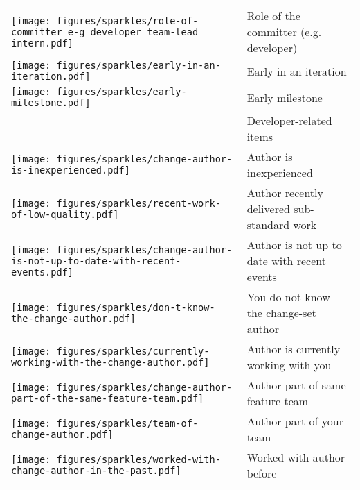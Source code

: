 \begin{table}[t!]
\begin{tabular}{ll}
\vspace{-2pt}\texttt{[image: figures/sparkles/role-of-committer--e-g--developer--team-lead--intern.pdf]} & Role of the committer (e.g. developer)\\
\vspace{-2pt}\texttt{[image: figures/sparkles/early-in-an-iteration.pdf]} & Early in an iteration\\
\vspace{-2pt}\texttt{[image: figures/sparkles/early-milestone.pdf]} & Early milestone\\
\midrule
\vspace{-2pt}& Developer-related items\\
\midrule
\vspace{-2pt}\texttt{[image: figures/sparkles/change-author-is-inexperienced.pdf]} & Author is inexperienced\\
\vspace{-2pt}\texttt{[image: figures/sparkles/recent-work-of-low-quality.pdf]} & Author recently delivered sub-standard work\\
\vspace{-2pt}\texttt{[image: figures/sparkles/change-author-is-not-up-to-date-with-recent-events.pdf]} & Author is not up to date with recent events\\
\vspace{-2pt}\texttt{[image: figures/sparkles/don-t-know-the-change-author.pdf]} & You do not know the change-set author \\
\vspace{-2pt}\texttt{[image: figures/sparkles/currently-working-with-the-change-author.pdf]} & Author is currently working with you\\
\vspace{-2pt}\texttt{[image: figures/sparkles/change-author-part-of-the-same-feature-team.pdf]} & Author part of same feature team\\
\vspace{-2pt}\texttt{[image: figures/sparkles/team-of-change-author.pdf]} & Author part of your team\\
\vspace{-2pt}\texttt{[image: figures/sparkles/worked-with-change-author-in-the-past.pdf]} & Worked with author before\\

\end{tabular}
\end{table}
